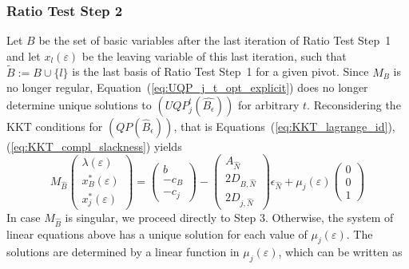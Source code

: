 \documentclass[a4paper]{article}
\begin{document}
\subsubsection{Ratio Test Step 2}
Let $B$ be the set of basic variables after the last iteration of 
Ratio Test Step~1
and let $x_{l}(\varepsilon)$ be the leaving variable of this last iteration,
such that $\tilde{B}:=B \cup \{l\}$ is the last basis
of Ratio Test Step~1 for a given pivot. Since
$M_{B}$ is no longer regular, Equation~(\ref{eq:UQP_j_t_opt_explicit}) does
no longer
determine unique solutions to $(UQP_{j}^{t}(\hat{B_{\epsilon}}))$ for arbitrary
$t$.
Reconsidering the KKT conditions for $(QP(\hat{B}_{\epsilon}))$, that is
Equations~(\ref{eq:KKT_lagrange_id}),(\ref{eq:KKT_compl_slackness}) yields
\begin{equation}
\label{eq:QP_j_mu_opt_explicit}
M_{\hat{B}}
\left(\begin{array}{c}
         \lambda\left(\varepsilon\right) \\
	 \hline
	 x_{B}^{*}\left(\varepsilon\right) \\
	 \hline
	 x_{j}^{*}\left(\varepsilon\right)
       \end{array}
\right)
=
\left(\begin{array}{c}
        b  \\
	\hline
	-c_{B} \\
	\hline
	-c_{j}
       \end{array}
\right)
-
\left(\begin{array}{c}
        A_{\hat{N}} \\
	\hline
	2D_{B, \hat{N}} \\
	\hline
	2D_{j, \hat{N}}
       \end{array}
\right)\epsilon_{\hat{N}}
+ \mu_{j}\left(\varepsilon\right)
\left(\begin{array}{c}
        0 \\
	\hline
	0 \\
	\hline
	1
       \end{array}
\right)
\end{equation}
In case $M_{\hat{B}}$ is singular, we proceed directly to Step 3. Otherwise,
the system of linear equations above has a unique solution for each value of
$\mu_{j}\left(\varepsilon\right)$. The solutions are determined by a linear
function in $\mu_{j}\left(\varepsilon\right)$, which can be written as
\end{document}
